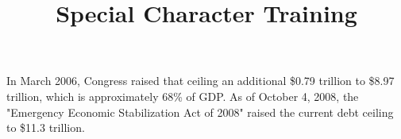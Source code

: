 \documentclass{article}
\title{Special Character Training}
\begin{document}
In March 2006, Congress raised that ceiling an 
additional \$0.79 trillion to \$8.97 trillion,
which is approximately 68\% of GDP. As of October
4, 2008, the "Emergency Economic Stabilization
Act of 2008" raised the current debt ceiling
to \$11.3 trillion.
\end{document}
